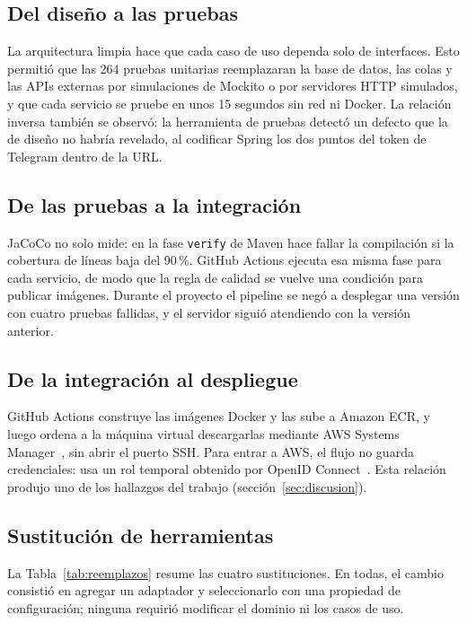 \documentclass[conference]{IEEEtran}
\begin{document}
\subsection{Del diseño a las pruebas}
La arquitectura limpia hace que cada caso de uso dependa solo de interfaces. Esto permitió que las 264 pruebas unitarias reemplazaran la base de datos, las colas y las APIs externas por simulaciones de Mockito o por servidores HTTP simulados, y que cada servicio se pruebe en unos 15 segundos sin red ni Docker. La relación inversa también se observó: la herramienta de pruebas detectó un defecto que la de diseño no habría revelado, al codificar Spring los dos puntos del token de Telegram dentro de la URL.

\subsection{De las pruebas a la integración}
JaCoCo no solo mide: en la fase \texttt{verify} de Maven hace fallar la compilación si la cobertura de líneas baja del 90\,\%. GitHub Actions ejecuta esa misma fase para cada servicio, de modo que la regla de calidad se vuelve una condición para publicar imágenes. Durante el proyecto el pipeline se negó a desplegar una versión con cuatro pruebas fallidas, y el servidor siguió atendiendo con la versión anterior.

\subsection{De la integración al despliegue}
GitHub Actions construye las imágenes Docker y las sube a Amazon ECR, y luego ordena a la máquina virtual descargarlas mediante AWS Systems Manager~\cite{ssm}, sin abrir el puerto SSH. Para entrar a AWS, el flujo no guarda credenciales: usa un rol temporal obtenido por OpenID Connect~\cite{oidc}. Esta relación produjo uno de los hallazgos del trabajo (sección~\ref{sec:discusion}).

\subsection{Sustitución de herramientas}
La Tabla~\ref{tab:reemplazos} resume las cuatro sustituciones. En todas, el cambio consistió en agregar un adaptador y seleccionarlo con una propiedad de configuración; ninguna requirió modificar el dominio ni los casos de uso.
\end{document}
